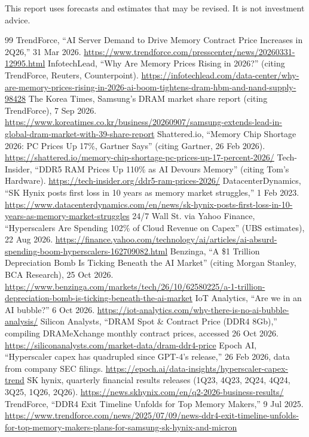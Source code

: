 \documentclass[11pt]{article}
\begin{document}
{\small\color{muted} This report uses forecasts and estimates that may be revised. It is not investment advice.}

\begingroup\raggedright
\begin{thebibliography}{99}\small
{} TrendForce, ``AI Server Demand to Drive Memory Contract Price Increases in 2Q26,'' 31 Mar 2026. \url{https://www.trendforce.com/presscenter/news/20260331-12995.html}
 InfotechLead, ``Why Are Memory Prices Rising in 2026?'' (citing TrendForce, Reuters, Counterpoint). \url{https://infotechlead.com/data-center/why-are-memory-prices-rising-in-2026-ai-boom-tightens-dram-hbm-and-nand-supply-98428}
 The Korea Times, Samsung's DRAM market share report (citing TrendForce), 7 Sep 2026. \url{https://www.koreatimes.co.kr/business/20260907/samsung-extends-lead-in-global-dram-market-with-39-share-report}
 Shattered.io, ``Memory Chip Shortage 2026: PC Prices Up 17\%, Gartner Says'' (citing Gartner, 26 Feb 2026). \url{https://shattered.io/memory-chip-shortage-pc-prices-up-17-percent-2026/}
 Tech-Insider, ``DDR5 RAM Prices Up 110\% as AI Devours Memory'' (citing Tom's Hardware). \url{https://tech-insider.org/ddr5-ram-prices-2026/}
 DatacenterDynamics, ``SK Hynix posts first loss in 10 years as memory market struggles,'' 1 Feb 2023. \url{https://www.datacenterdynamics.com/en/news/sk-hynix-posts-first-loss-in-10-years-as-memory-market-struggles}
 24/7 Wall St. via Yahoo Finance, ``Hyperscalers Are Spending 102\% of Cloud Revenue on Capex'' (UBS estimates), 22 Aug 2026. \url{https://finance.yahoo.com/technology/ai/articles/ai-absurd-spending-boom-hyperscalers-162709082.html}
 Benzinga, ``A \$1 Trillion Depreciation Bomb Is Ticking Beneath the AI Market'' (citing Morgan Stanley, BCA Research), 25 Oct 2026. \url{https://www.benzinga.com/markets/tech/26/10/62580225/a-1-trillion-depreciation-bomb-is-ticking-beneath-the-ai-market}
 IoT Analytics, ``Are we in an AI bubble?'' 6 Oct 2026. \url{https://iot-analytics.com/why-there-is-no-ai-bubble-analysis/}
 Silicon Analysts, ``DRAM Spot \& Contract Price (DDR4 8Gb),'' compiling DRAMeXchange monthly contract prices, accessed 26 Oct 2026. \url{https://siliconanalysts.com/market-data/dram-ddr4-price}
 Epoch AI, ``Hyperscaler capex has quadrupled since GPT-4's release,'' 26 Feb 2026, data from company SEC filings. \url{https://epoch.ai/data-insights/hyperscaler-capex-trend}
 SK hynix, quarterly financial results releases (1Q23, 4Q23, 2Q24, 4Q24, 3Q25, 1Q26, 2Q26). \url{https://news.skhynix.com/en/q2-2026-business-results/}
 TrendForce, ``DDR4 Exit Timeline Unfolds for Top Memory Makers,'' 9 Jul 2025. \url{https://www.trendforce.com/news/2025/07/09/news-ddr4-exit-timeline-unfolds-for-top-memory-makers-plans-for-samsung-sk-hynix-and-micron}
\end{thebibliography}
\endgroup
\end{document}
